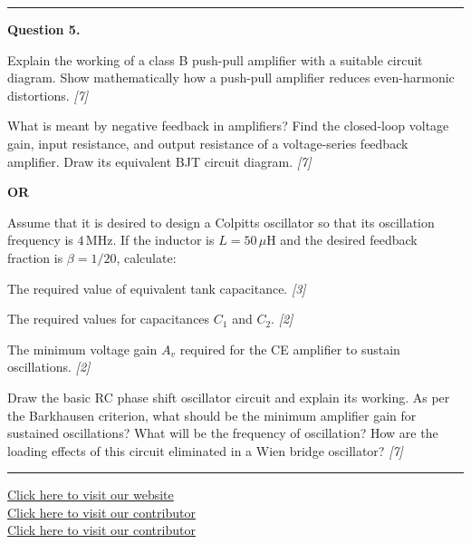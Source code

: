 \documentclass[11pt,a4paper]{article}
\newcommand{\pts}[1]{\hfill   \textit{[#1]}}
\begin{document}
\medskip\rule{\linewidth}{0.2pt}




\noindent   \textbf{Question 5.}

\begin{parts}
  \item Explain the working of a class B push-pull amplifier with a suitable circuit diagram. Show mathematically how a push-pull amplifier reduces even-harmonic distortions. \pts{7}
  \item What is meant by negative feedback in amplifiers? Find the closed-loop voltage gain, input resistance, and output resistance of a voltage-series feedback amplifier. Draw its equivalent BJT circuit diagram. \pts{7}
\end{parts}
\hfill   \textbf{OR}

\begin{parts}
  \item Assume that it is desired to design a Colpitts oscillator so that its oscillation frequency is $4\, \text{MHz}$. If the inductor is $L = 50\,\mu \text{H}$ and the desired feedback fraction is $\beta = 1/20$, calculate:
    
\begin{parts}
      \item The required value of equivalent tank capacitance. \pts{3}
      \item The required values for capacitances $C_1$ and $C_2$. \pts{2}
      \item The minimum voltage gain $A_v$ required for the CE amplifier to sustain oscillations. \pts{2}
    \end{parts}
  \item Draw the basic RC phase shift oscillator circuit and explain its working. As per the Barkhausen criterion, what should be the minimum amplifier gain for sustained oscillations? What will be the frequency of oscillation? How are the loading effects of this circuit eliminated in a Wien bridge oscillator? \pts{7}
\end{parts}

\vfill
\rule{\linewidth}{0.4pt}

\begin{center}\small
  \href{https://bhu-exam.vercel.app/}{Click here to visit our website}\\[4pt]
  \href{https://me-aryan.vercel.app/}{Click here to visit our contributor}\\[4pt]
  \href{https://quashan-me.vercel.app/}{Click here to visit our contributor}
\end{center}
\end{document}
